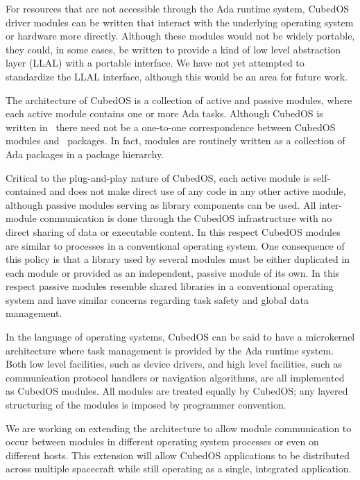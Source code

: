 For resources that are not accessible through the Ada runtime system, CubedOS driver modules can
be written that interact with the underlying operating system or hardware more directly.
Although these modules would not be widely portable, they could, in some cases, be written to
provide a kind of low level abstraction layer (LLAL) with a portable interface. We have not yet
attempted to standardize the LLAL interface, although this would be an area for future work.

The architecture of CubedOS is a collection of active and passive modules, where each active
module contains one or more Ada tasks. Although CubedOS is written in \SPARK\ there need not be
a one-to-one correspondence between CubedOS modules and \SPARK\ packages. In fact, modules are
routinely written as a collection of Ada packages in a package hierarchy. 

Critical to the plug-and-play nature of CubedOS, each active module is self-contained and does
not make direct use of any code in any other active module, although passive modules serving as
library components can be used. All inter-module communication is done through the CubedOS
infrastructure with no direct sharing of data or executable content. In this respect CubedOS
modules are similar to processes in a conventional operating system. One consequence of this
policy is that a library used by several modules must be either duplicated in each module or
provided as an independent, passive module of its own. In this respect passive modules resemble
shared libraries in a conventional operating system and have similar concerns regarding task
safety and global data management.

In the language of operating systems, CubedOS can be said to have a microkernel architecture
where task management is provided by the Ada runtime system. Both low level facilities, such as
device drivers, and high level facilities, such as communication protocol handlers or navigation
algorithms, are all implemented as CubedOS modules. All modules are treated equally by CubedOS;
any layered structuring of the modules is imposed by programmer convention.

We are working on extending the architecture to allow module communication to occur between
modules in different operating system processes or even on different hosts. This extension will
allow CubedOS applications to be distributed across multiple spacecraft while still operating as
a single, integrated application. 


